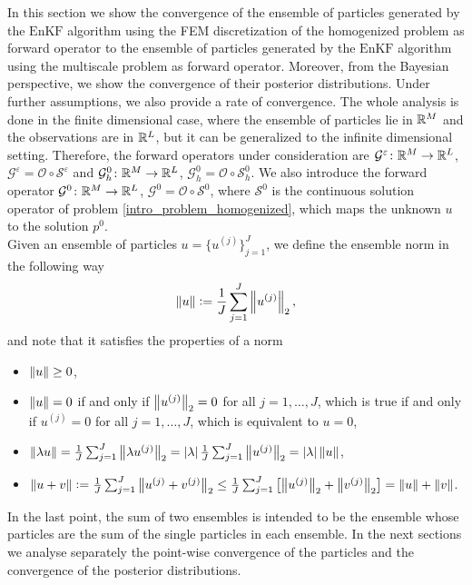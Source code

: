 \documentclass[10pt]{article}
\begin{document}
In this section we show the convergence of the ensemble of particles generated by the $\mathrm{EnKF}$ algorithm using the FEM discretization of the homogenized problem as forward operator to the ensemble of particles generated by the $\mathrm{EnKF}$ algorithm using the multiscale problem as forward operator. Moreover, from the Bayesian perspective, we show the convergence of their posterior distributions. Under further assumptions, we also provide a rate of convergence. The whole analysis is done in the finite dimensional case, where the ensemble of particles lie in $\mathbb{R}^M$ and the observations are in $\mathbb{R}^L$, but it can be generalized to the infinite dimensional setting. Therefore, the forward operators under consideration are $\mathcal{G}^{\varepsilon} \colon \mathbb{R}^M \to \mathbb{R}^L$, $\mathcal{G}^{\varepsilon} = \mathcal{O} \circ \mathcal{S}^{\varepsilon}$ and $\mathcal{G}^0_h \colon \mathbb{R}^M \to \mathbb{R}^L$, $\mathcal{G}^0_h = \mathcal{O} \circ \mathcal{S}^0_h$. We also introduce the forward operator $\mathcal{G}^0 \colon \mathbb{R}^M \to \mathbb{R}^L$, $\mathcal{G}^0 = \mathcal{O} \circ \mathcal{S}^0$, where $\mathcal{S}^0$ is the continuous solution operator of problem \eqref{intro_problem_homogenized}, which maps the unknown $u$ to the solution $p^0$. \\
Given an ensemble of particles $u = \{ u^{(j)} \}_{j = 1}^J$, we define the ensemble norm in the following way
\begin{equation}
\label{ensemble_norm}
\left\|u\right\| \vcentcolon = \frac{1}{J} \sum_{j=1}^J \left\|u^{(j)}\right\|_2,
\end{equation}
and note that it satisfies the properties of a norm
\begin{itemize}
\item $\left\|u\right\| \ge 0$,
\item $\left\|u\right\| = 0$ if and only if $\left\|u^{(j)}\right\|_2 = 0$ for all $j = 1, \dots, J$, which is true if and only if $u^{(j)} = 0$ for all $j = 1, \dots, J$, which is equivalent to $u = 0$,
\item $\left\|\lambda u\right\| = \frac{1}{J} \sum_{j=1}^J \left\|\lambda u^{(j)}\right\|_2 = \left\lvert\lambda\right\rvert \frac{1}{J} \sum_{j=1}^J \left\|u^{(j)}\right\|_2 = \left\lvert\lambda\right\rvert \left\|u\right\|$,
\item $\left\|u + v\right\| \vcentcolon = \frac{1}{J} \sum_{j=1}^J \left\|u^{(j)} + v^{(j)}\right\|_2 \le \frac{1}{J} \sum_{j=1}^J \left [ \left\|u^{(j)}\right\|_2 + \left\|v^{(j)}\right\|_2 \right ] = \left\|u\right\| + \left\|v\right\|$.
\end{itemize}
In the last point, the sum of two ensembles is intended to be the ensemble whose particles are the sum of the single particles in each ensemble. In the next sections we analyse separately the point-wise convergence of the particles and the convergence of the posterior distributions.
\end{document}

